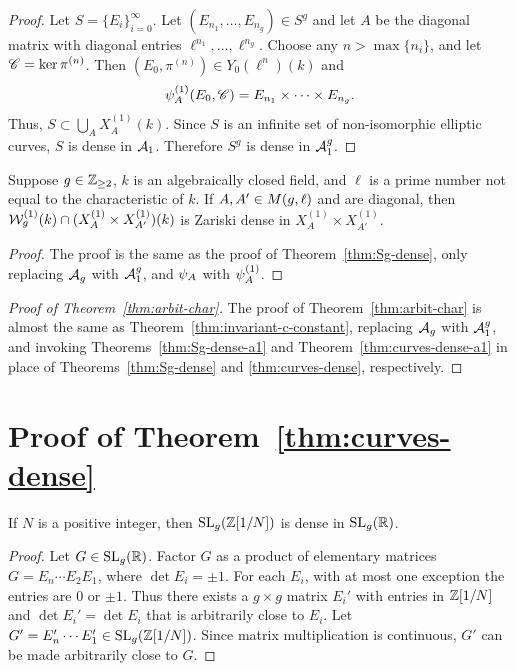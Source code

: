 \documentclass{amsart}
\begin{document}
\begin{proof}
 Let $S = \{E_i\}_{i=0}^\infty$. Let $(E_{n_1},\dots,E_{n_g}) \in S^g$ and let $A$ be the diagonal matrix with diagonal entries $\ell^{n_1},\dots,\ell^{n_g}$.  Choose any $n > \max\{n_i\}$, and let $\mathscr{C} = \ker \pi^{(n)}$. Then $(E_0,\pi^{(n)}) \in Y_0(\ell^n)(k)$ and
 \[
   \psi_{A}^{(1)}(E_0,\mathscr{C}) = E_{n_1} \times \cdots \times E_{n_g}.
 \]
Thus, $S \subset \bigcup_A X^{(1)}_A(k)$. Since $S$ is an infinite set of non-isomorphic elliptic curves, $S$ is dense in $\mathcal{A}_1$. Therefore $S^g$ is dense in $\mathcal{A}_1^g$.
\end{proof}

\begin{theorem}\label{thm:Sg-dense-a1}
  Suppose $g\in\mathbb{Z}_{\ge 2}$, $k$ is an algebraically closed field, and $\ell$ is a prime number not equal to the characteristic of $k$. If $A,A' \in M(g,\ell)$ and are diagonal, then $\mathcal{W}_g^{(1)}(k) \cap (X^{(1)}_A \times X^{(1)}_{A'})(k)$ is Zariski dense in $X^{(1)}_A \times X^{(1)}_{A'}$.
\end{theorem}

\begin{proof}
  The proof is the same as the proof of Theorem~\ref{thm:Sg-dense}, only replacing $\mathcal{A}_g$ with $\mathcal{A}_1^g$, and $\psi_{A}$ with $\psi_{A}^{(1)}$.
\end{proof}

\begin{proof}[Proof of Theorem~\ref{thm:arbit-char}]
  The proof of Theorem~\ref{thm:arbit-char} is almost the same as Theorem~\ref{thm:invariant-c-constant}, replacing $\mathcal{A}_g$  with $\mathcal{A}_1^g$, and invoking Theorems~\ref{thm:Sg-dense-a1} and  Theorem~\ref{thm:curves-dense-a1} in place of Theorems~\ref{thm:Sg-dense} and \ref{thm:curves-dense}, respectively.
\end{proof}








\section{Proof of Theorem~\ref{thm:curves-dense}}
\label{sec:step-1}

\begin{lemma}\label{lem:sl-dense}
  If $N$ is a positive integer, then $\operatorname{SL}_g(\mathbb{Z}[1/N])$ is dense in $\operatorname{SL}_g(\mathbb{R})$.
\end{lemma}
\begin{proof}
  Let $G \in \operatorname{SL}_g(\mathbb{R})$. Factor $G$ as a product of elementary matrices $G = E_n \cdots E_2 E_1$, where $\det E_i = \pm 1$. For each $E_i$, with at most one exception the entries are $0$ or $\pm 1$. Thus there exists a $g \times g$ matrix $E_i'$ with entries in $\mathbb{Z}[1/N]$ and $\det E_i' = \det E_i$ that is arbitrarily close to $E_i$. Let $G' = E_n' \cdots E_1' \in \operatorname{SL}_g(\mathbb{Z}[1/N])$. Since matrix multiplication is continuous, $G'$ can be made arbitrarily close to $G$.
\end{proof}
\end{document}
